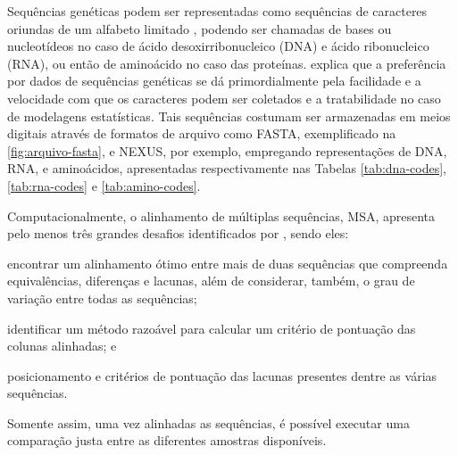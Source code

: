 \documentclass[english,brazilian]{UNISINOSmonografia} %
\begin{document}
Sequências genéticas podem ser representadas como sequências de caracteres oriundas de um alfabeto limitado \cite{DarribaPHD}, podendo ser chamadas de bases ou nucleotídeos no caso de ácido desoxirribonucleico (DNA) e ácido ribonucleico (RNA), ou então de aminoácido no caso das proteínas.
 explica que a preferência por dados de sequências genéticas se dá primordialmente pela facilidade e a velocidade com que os caracteres podem ser coletados e a tratabilidade no caso de modelagens estatísticas.
Tais sequências costumam ser armazenadas em meios digitais através de formatos de arquivo como FASTA, exemplificado na \autoref{fig:arquivo-fasta}, e NEXUS, por exemplo, empregando representações de DNA, RNA, e aminoácidos, apresentadas respectivamente nas Tabelas \ref{tab:dna-codes}, \ref{tab:rna-codes} e \ref{tab:amino-codes}.


%
%
%


Computacionalmente, o alinhamento de múltiplas sequências, MSA, apresenta pelo menos três grandes desafios identificados por , sendo eles: \begin{inparaenum} 
	\item encontrar um alinhamento ótimo entre mais de duas sequências que compreenda equivalências, diferenças e lacunas, além de considerar, também, o grau de variação entre todas as sequências;
	\item identificar um método razoável para calcular um critério de pontuação das colunas alinhadas; e
	\item posicionamento e critérios de pontuação das lacunas presentes dentre as várias sequências.
\end{inparaenum}
Somente assim, uma vez alinhadas as sequências, é possível executar uma comparação justa entre as diferentes amostras disponíveis.
\end{document}
